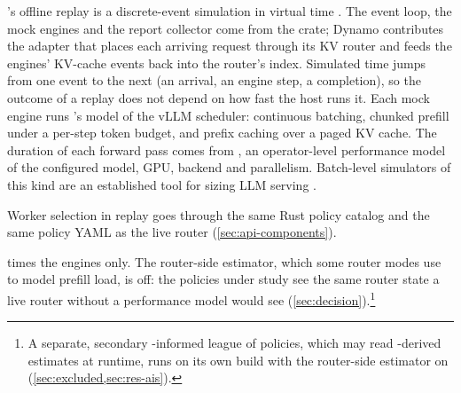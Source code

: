 \aisim{}'s offline replay is a discrete-event simulation in virtual time
\citep{aisimulate,dynamo}. The event loop, the mock engines and the report collector
come from the  crate; Dynamo contributes the adapter that places each
arriving request through its KV router and feeds the engines' KV-cache events back into the
router's index. Simulated time jumps from one event to the next (an arrival, an engine step, a
completion), so the outcome of a replay does not depend on how fast the host runs it.
Each mock engine runs 's model of the vLLM scheduler: continuous batching,
chunked prefill under a per-step token budget, and prefix caching over a paged KV cache. The
duration of each forward pass comes from \ais{}, an operator-level performance model of the
configured model, GPU, backend and parallelism.
Batch-level simulators of this kind are an established tool for sizing LLM serving
\citep{agrawal2024vidur}.

Worker selection in replay goes through the same Rust policy catalog and the same policy YAML as
the live router (\cref{sec:api-components}).

\ais{} times the engines only. The router-side \ais{} estimator, which some router modes use to
model prefill load, is off: the policies under study see the same router state a live router
without a performance model would see (\cref{sec:decision}).\footnote{A separate, secondary
  \ais{}-informed league of policies, which may read \ais{}-derived estimates at runtime, runs on
  its own build with the router-side estimator on (\cref{sec:excluded,sec:res-ais}).}

